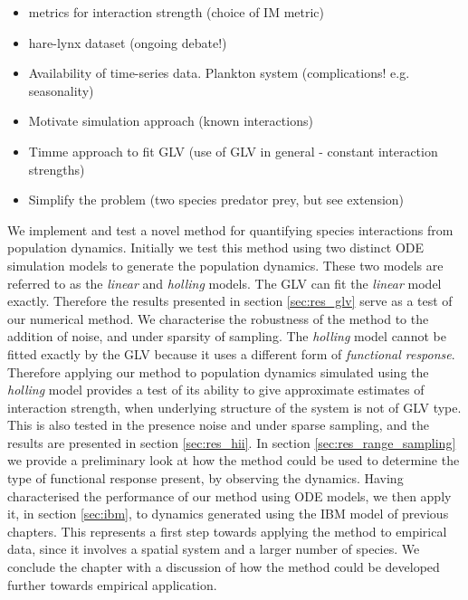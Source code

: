 \begin{itemize}
	\item metrics for interaction strength (choice of IM metric)
	\item hare-lynx dataset (ongoing debate!)
	\item Availability of time-series data. Plankton system (complications! e.g. seasonality)
	\item Motivate simulation approach (known interactions)
	\item Timme approach to fit GLV (use of GLV in general - constant interaction strengths)
	\item Simplify the problem (two species predator prey, but see extension)
\end{itemize}

We implement and test a novel method for quantifying species interactions from population dynamics. Initially we test this method using two distinct ODE simulation models to generate the population dynamics. These two models are referred to as the \emph{linear} and \emph{holling} models. The GLV can fit the \emph{linear} model exactly. Therefore the results presented in section \ref{sec:res_glv} serve as a test of our numerical method. We characterise the robustness of the method to the addition of noise, and under sparsity of sampling. The \emph{holling} model cannot be fitted exactly by the GLV because it uses a different form of \emph{functional response}. Therefore applying our method to population dynamics simulated using the \emph{holling} model provides a test of its ability to give approximate estimates of interaction strength, when underlying structure of the system is not of GLV type. This is also tested in the presence noise and under sparse sampling, and the results are presented in section \ref{sec:res_hii}. In section \ref{sec:res_range_sampling} we provide a preliminary look at how the method could be used to determine the type of functional response present, by observing the dynamics. Having characterised the performance of our method using ODE models, we then apply it, in section \ref{sec:ibm}, to dynamics generated using the IBM model of previous chapters. This represents a first step towards applying the method to empirical data, since it involves a spatial system and a larger number of species. We conclude the chapter with a discussion of how the method could be developed further towards empirical application. 

